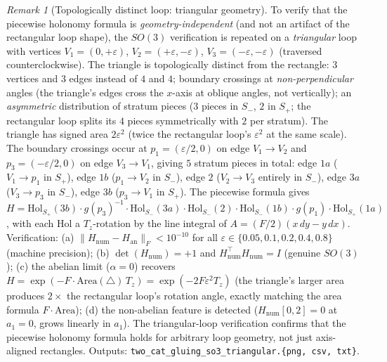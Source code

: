 \documentclass[11pt,a4paper]{article}
\theoremstyle{plain}
\theoremstyle{definition}
\theoremstyle{remark}
\newtheorem{remark}[theorem]{Remark}
\begin{document}
\begin{remark}[Topologically distinct loop: triangular geometry]
\label{rem:2cat-gluing-so3-triangular}
To verify that the piecewise holonomy formula is
\emph{geometry-independent} (and not an artifact of the rectangular loop
shape), the $SO(3)$ verification is repeated on a
\emph{triangular} loop with vertices
$V_1 = (0, +\varepsilon)$, $V_2 = (+\varepsilon, -\varepsilon)$,
$V_3 = (-\varepsilon, -\varepsilon)$ (traversed counterclockwise). The
triangle is topologically distinct from the rectangle: $3$ vertices and
$3$ edges instead of $4$ and $4$; boundary crossings at
\emph{non-perpendicular} angles (the triangle's edges cross the $x$-axis at
oblique angles, not vertically); an \emph{asymmetric} distribution of stratum
pieces ($3$ pieces in $S_-$, $2$ in $S_+$; the rectangular loop splits
its $4$ pieces symmetrically with $2$ per stratum). The triangle has
signed area $2\varepsilon^2$ (twice the rectangular loop's $\varepsilon^2$
at the same scale). The boundary crossings occur at $p_1 = (\varepsilon/2,
0)$ on edge $V_1 \to V_2$ and $p_3 = (-\varepsilon/2, 0)$ on edge $V_3
\to V_1$, giving $5$ stratum pieces in total: edge $1a$ ($V_1 \to p_1$
in $S_+$), edge $1b$ ($p_1 \to V_2$ in $S_-$), edge $2$ ($V_2 \to V_3$
entirely in $S_-$), edge $3a$ ($V_3 \to p_3$ in $S_-$), edge $3b$ ($p_3
\to V_1$ in $S_+$). The piecewise formula gives $H = \mathrm{Hol}_{S_+}(3b)
\cdot g(p_3)^{-1} \cdot \mathrm{Hol}_{S_-}(3a) \cdot
\mathrm{Hol}_{S_-}(2) \cdot \mathrm{Hol}_{S_-}(1b) \cdot g(p_1) \cdot
\mathrm{Hol}_{S_+}(1a)$, with each $\mathrm{Hol}$ a $T_z$-rotation by the
line integral of $A = (F/2)(x\,dy - y\,dx)$. Verification: (a)
$\|H_{\mathrm{num}} - H_{\mathrm{an}}\|_F < 10^{-10}$ for all $\varepsilon
\in \{0.05, 0.1, 0.2, 0.4, 0.8\}$ (machine precision); (b)
$\det(H_{\mathrm{num}}) = +1$ and $H_{\mathrm{num}}^\top H_{\mathrm{num}}
= I$ (genuine $SO(3)$); (c) the abelian limit ($\alpha = 0$) recovers
$H = \exp(-F \cdot \mathrm{Area}(\triangle) \,T_z) = \exp(-2 F
\varepsilon^2 T_z)$ (the triangle's larger area produces $2\times$ the
rectangular loop's rotation angle, exactly matching the area formula
$F \cdot \mathrm{Area}$); (d) the non-abelian feature is detected
($H_{\mathrm{num}}[0,2] = 0$ at $a_1 = 0$, grows linearly in $a_1$).
The triangular-loop verification confirms that the piecewise holonomy
formula holds for arbitrary loop geometry, not just axis-aligned
rectangles. Outputs:
\texttt{two\_cat\_gluing\_so3\_triangular.\{png, csv, txt\}}.
\end{remark}
\end{document}
